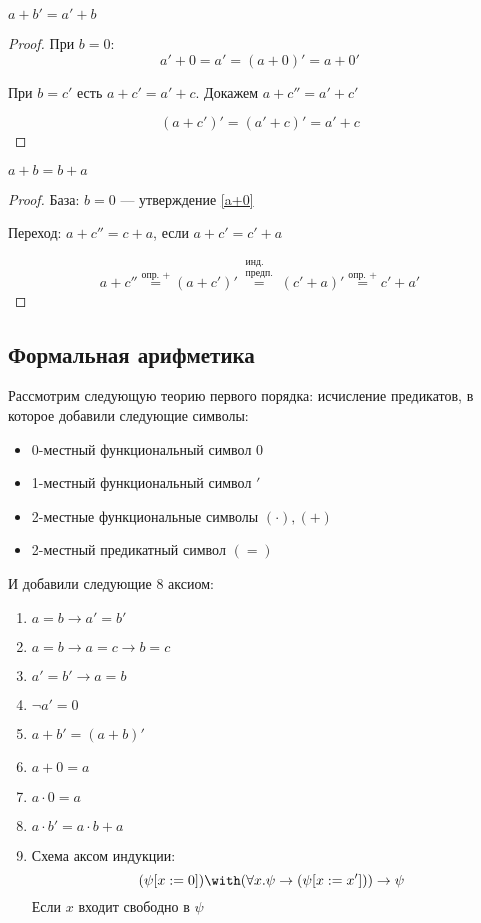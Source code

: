\begin{statement}
    \(a + b' = a' + b\)
\end{statement}

\begin{proof}
    При \(b = 0\):
    \[a' + 0 = a' = (a + 0)' = a + 0'\]

    При \(b = c'\) есть \(a + c' = a' + c\). Докажем \(a + c'' = a' + c'\)

    \[(a + c')' = (a' + c)' = a' + c\]
\end{proof}

\begin{statement}
    \(a + b = b + a\)
\end{statement}

\begin{proof}
    База: \(b = 0\) --- утверждение \ref{a+0}

    Переход: \(a + c'' = c + a\), если \(a + c' = c' + a\)

    \[a + c'' \stackrel{\text{опр. }+}{= } (a + c')' \stackrel{\substack{\text{инд.}\\\text{предп.}}}{=} (c' + a)' \stackrel{\text{опр. }+}{= } c' + a'\]
\end{proof}

\subsection{Формальная арифметика}

Рассмотрим следующую теорию первого порядка: исчисление предикатов, в которое добавили следующие символы:
\begin{itemize}
    \item 0-местный функциональный символ \(0\)
    \item 1-местный функциональный символ \('\)
    \item 2-местные функциональные символы \((\cdot), ( +)\)
    \item 2-местный предикатный символ \((=)\)
\end{itemize}

И добавили следующие 8 аксиом:
\begin{enumerate}
    \item \(a = b \to a' = b'\)
    \item \(a = b \to a = c \to b = c\)
    \item \(a' = b' \to a = b\)
    \item \(\neg a' = 0\)
    \item \(a + b' = (a + b)'\)
    \item \(a + 0 = a\)
    \item \(a \cdot 0 = a\)
    \item \(a \cdot b' = a \cdot b + a\)
    \item Схема аксом индукции:
          \[(\psi[x: = 0]) \with (\forall x.\psi \to (\psi[x: = x'])) \to \psi\]
          Если \(x\) входит свободно в \(\psi\)
\end{enumerate}

